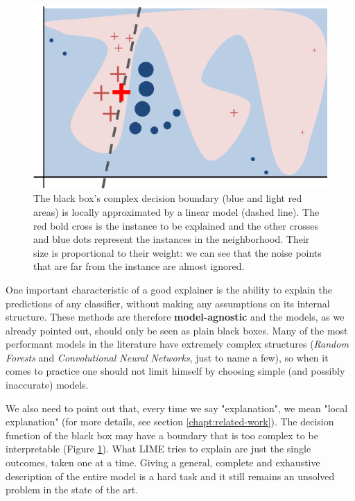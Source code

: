 \documentclass[12pt, twoside, a4paper]{report}
\begin{document}
\begin{figure}
\begin{center}

 \includegraphics[scale=1]{images/easy_model.png}
 \end{center} 
\caption[]{The black box's complex decision boundary (blue and light red areas) is locally approximated by a linear model (dashed line). The red bold cross is the instance to be explained and the other crosses and blue dots represent the instances in the neighborhood. Their size is proportional to their weight: we can see that the noise points that are far from the instance are almost ignored.\footnotemark}
\label{fig:decision_bound}
\end{figure}


One important characteristic of a good explainer is the ability to explain the predictions of any classifier, without making any assumptions on its internal structure. These methods are therefore \textbf{model-agnostic} and the models, as we already pointed out, should only be seen as plain black boxes. Many of the most performant models in the literature have extremely complex structures (\textit{Random Forests} and \textit{Convolutional Neural Networks}, just to name a few), so when it comes to practice one should not limit himself by choosing simple (and possibly inaccurate) models.

We also need to point out that, every time we say "explanation", we mean "local explanation" (for more details, see section \ref{chapt:related-work}). The decision function of the black box may have a boundary that is too complex to be interpretable (Figure \ref{fig:decision_bound}). What LIME tries to explain are just the single outcomes, taken one at a time. Giving a general, complete and exhaustive description of the entire model is a hard task and it still remains an unsolved problem in the state of the art.
\end{document}
